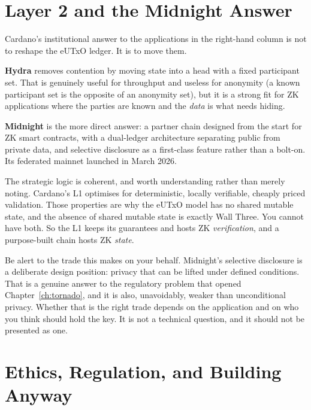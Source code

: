 \section{Layer 2 and the Midnight Answer} \label{sec:ch9-l2}

Cardano's institutional answer to the applications in the right-hand column is
not to reshape the eUTxO ledger. It is to move them.

\textbf{Hydra} removes contention by moving state into a head with a fixed
participant set. That is genuinely useful for throughput and useless for
anonymity (a known participant set is the opposite of an anonymity set), but
it is a strong fit for ZK applications where the parties are known and the
\emph{data} is what needs hiding.

\textbf{Midnight} is the more direct answer: a partner chain designed from the
start for ZK smart contracts, with a dual-ledger architecture separating public
from private data, and selective disclosure as a first-class feature rather than
a bolt-on. Its federated mainnet launched in March 2026.

The strategic logic is coherent, and worth understanding rather than merely
noting. Cardano's L1 optimises for deterministic, locally verifiable, cheaply
priced validation. Those properties are why the eUTxO model has no shared
mutable state, and the absence of shared mutable state is exactly Wall Three.
You cannot have both. So the L1 keeps its guarantees and hosts ZK
\emph{verification}, and a purpose-built chain hosts ZK \emph{state}.

\begin{remark}
Be alert to the trade this makes on your behalf. Midnight's selective disclosure
is a deliberate design position: privacy that can be lifted under defined
conditions. That is a genuine answer to the regulatory problem that opened
Chapter~\ref{ch:tornado}, and it is also, unavoidably, weaker than
unconditional privacy. Whether that is the right trade depends on the
application and on who you think should hold the key. It is not a technical
question, and it should not be presented as one.
\end{remark}

\section{Ethics, Regulation, and Building Anyway} \label{sec:ch9-ethics}

